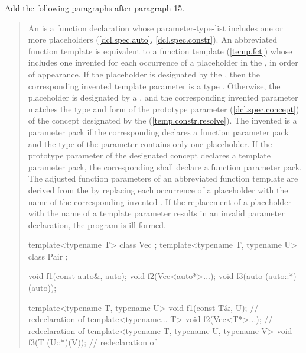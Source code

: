 Add the following paragraphs after paragraph 15.

\begin{quote}
\pnum
An  is a function declaration whose
parameter-type-list includes one or more placeholders (\ref{dcl.spec.auto},
\ref{dcl.spec.constr}).
% 
An abbreviated function template is equivalent to a function template
(\ref{temp.fct}) whose 
includes one invented  for each occurrence 
of a placeholder in the ,
in order of appearance. 
% 
If the placeholder is designated by the 
, then the corresponding invented template 
parameter is a type .
% 
Otherwise, the placeholder is designated by a 
, and the corresponding invented 
parameter matches the type and form of the prototype parameter 
(\ref{dcl.spec.concept}) of the concept designated by the 
 (\ref{temp.constr.resolve}).
% 
The invented  is a parameter pack if 
the corresponding  declares a function 
parameter pack and the type of the parameter contains only one placeholder.
% 
If the prototype parameter of the designated concept declares a template 
parameter pack, the corresponding  shall
declare a function parameter pack.
% 
The adjusted function parameters of an abbreviated function template are derived
from the  by replacing each 
occurrence of a placeholder with the name of the corresponding invented 
.
% 
If the replacement of a placeholder with the name of a template parameter
results in an invalid parameter declaration, the program is ill-formed.

\enterexample
\begin{codeblock}
template<typename T> class Vec { };
template<typename T, typename U> class Pair { };

void f1(const auto&, auto);
void f2(Vec<auto*>...);
void f3(auto (auto::*)(auto));

template<typename T, typename U> 
  void f1(const T&, U);        // redeclaration of 
template<typename... T> 
  void f2(Vec<T*>...);         // redeclaration of 
template<typename T, typename U, typename V>
  void f3(T (U::*)(V));        // redeclaration of 


\end{codeblock}
\end{quote}
